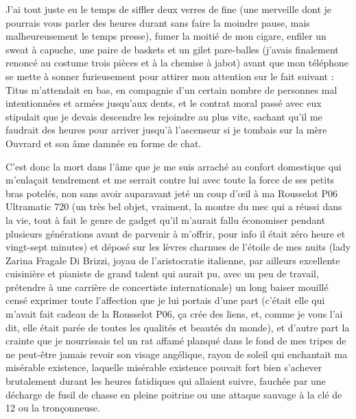 J’ai tout juste eu le temps de siffler deux verres de fine (une merveille dont je pourrais vous parler des heures durant sans faire la moindre pause, mais malheureusement le temps presse), fumer la moitié de mon cigare, enfiler un sweat à capuche, une paire de baskets et un gilet pare-balles (j’avais finalement renoncé au costume trois pièces et à la chemise à jabot) avant que mon téléphone se mette à sonner furieusement pour attirer mon attention sur le fait suivant : Titus m’attendait en bas, en compagnie d’un certain nombre de personnes mal intentionnées et armées jusqu’aux dents, et le contrat moral passé avec eux stipulait que je devais descendre les rejoindre au plus vite, sachant qu’il me faudrait des heures pour arriver jusqu’à l’ascenseur si je tombais sur la mère Ouvrard et son âme damnée en forme de chat.

C’est donc la mort dans l’âme que je me suis arraché au confort domestique qui m’enlaçait tendrement et me serrait contre lui avec toute la force de ses petits bras potelés, non sans avoir auparavant jeté un coup d’œil à ma Rousselot P06 Ultramatic 720 (un très bel objet, vraiment, la montre du mec qui a réussi dans la vie, tout à fait le genre de gadget qu’il m’aurait fallu économiser pendant plusieurs générations avant de parvenir à m’offrir, pour info il était zéro heure et vingt-sept minutes) et déposé sur les lèvres charnues de l’étoile de mes nuits (lady Zarina Fragale Di Brizzi, joyau de l’aristocratie italienne, par ailleurs excellente cuisinière et pianiste de grand talent qui aurait pu, avec un peu de travail, prétendre à une carrière de concertiste internationale) un long baiser mouillé censé exprimer toute l’affection que je lui portais d’une part (c’était elle qui m’avait fait cadeau de la Rousselot P06, ça crée des liens, et, comme je vous l’ai dit, elle était parée de toutes les qualités et beautés du monde), et d’autre part la crainte que je nourrissais tel un rat affamé planqué dans le fond de mes tripes de ne peut-être jamais revoir son visage angélique, rayon de soleil qui enchantait ma misérable existence, laquelle misérable existence pouvait fort bien s’achever brutalement durant les heures fatidiques qui allaient suivre, fauchée par une décharge de fusil de chasse en pleine poitrine ou une attaque sauvage à la clé de 12 ou la tronçonneuse.

